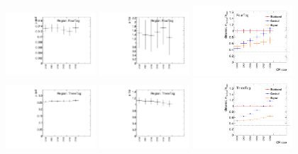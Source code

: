 \begin{figure}[htbp!]
\begin{center}
\includegraphics[width=0.3\textwidth,angle=-90]{figures/boosted/Appendix_SB/FourTag_muqcdCR.pdf}
\includegraphics[width=0.3\textwidth,angle=-90]{figures/boosted/Appendix_SB/FourTag_mutopCR.pdf}
\includegraphics[width=0.33\textwidth,angle=-90]{figures/boosted/Appendix_SB/data_est_FourTag_sigma_compareCR.pdf}\\
\includegraphics[width=0.3\textwidth,angle=-90]{figures/boosted/Appendix_SB/ThreeTag_muqcdCR.pdf}
\includegraphics[width=0.3\textwidth,angle=-90]{figures/boosted/Appendix_SB/ThreeTag_mutopCR.pdf}
\includegraphics[width=0.33\textwidth,angle=-90]{figures/boosted/Appendix_SB/data_est_ThreeTag_sigma_compareCR.pdf}\\

\end{center}
\end{figure}

